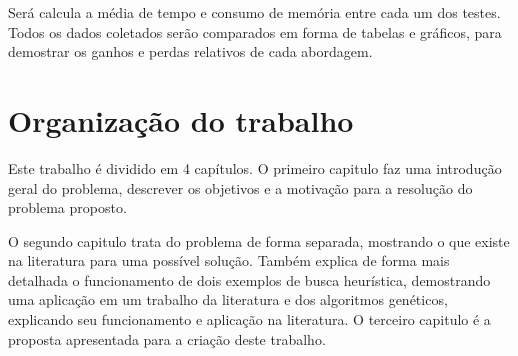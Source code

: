 Será calcula a média de tempo e consumo de memória entre cada um dos testes. Todos os dados coletados serão comparados em forma de tabelas e gráficos, para demostrar os ganhos e perdas relativos de cada abordagem.

\section{Organização do trabalho}
Este trabalho é dividido em 4 capítulos. O primeiro capitulo faz uma introdução geral do problema, descrever os objetivos e a motivação para a resolução do problema proposto.

O segundo capitulo trata do problema de forma separada, mostrando o que existe na literatura para uma possível solução. Também explica de forma mais detalhada o funcionamento de dois exemplos de busca heurística, demostrando uma aplicação em um trabalho da literatura e dos algoritmos genéticos, explicando seu funcionamento e aplicação na literatura.
O terceiro capitulo é a proposta apresentada para a criação deste trabalho.

